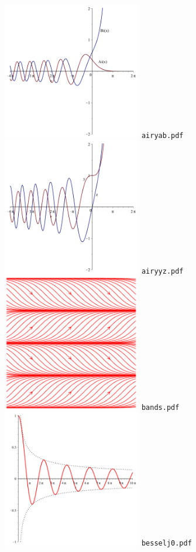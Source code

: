 \documentclass[a4paper]{amsart}
\begin{document}
\includegraphics[width=6cm]{airyab.pdf}\verb+ airyab.pdf+\\
\includegraphics[width=6cm]{airyyz.pdf}\verb+ airyyz.pdf+\\
\includegraphics[width=6cm]{bands.pdf}\verb+ bands.pdf+\\
\includegraphics[width=6cm]{besselj0.pdf}\verb+ besselj0.pdf+\\
\end{document}
